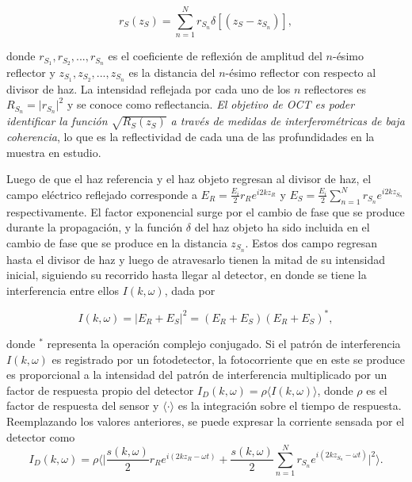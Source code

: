 \begin{equation}
r_S(z_S) = \sum_{n=1}^{N} r_{S_n} \delta[(z_S - z_{S_n})],
\end{equation}

\noindent donde $r_{S_1}, r_{S_2}, ..., r_{S_n}$ es el coeficiente de reflexión de amplitud del $n$-ésimo reflector y $ z_{S_1}, z_{S_2}, ..., z_{S_n}$ es la distancia del $n$-ésimo reflector con respecto al divisor de haz. La intensidad reflejada por cada uno de los $n$ reflectores es $R_{S_n} = \lvert r_{S_n} \rvert^2$ y se conoce como reflectancia. \emph{El objetivo de OCT es poder identificar la función $\sqrt{R_{S}(z_S)}$ a través de medidas de interferométricas de baja coherencia}, lo que es la reflectividad de cada una de las profundidades en la muestra en estudio.

Luego de que el haz referencia y el haz objeto regresan al divisor de haz, el campo eléctrico reflejado corresponde a $E_R = \frac{E_i}{2}r_Re^{i2kz_R}$ y $E_S = \frac{E_i}{2} \sum_{n=1}^{N}r_{S_n} e^{i2kz_{S_n}}$ respectivamente. El factor exponencial surge por el cambio de fase que se produce durante la propagación, y la función $\delta$ del haz objeto ha sido incluida en el cambio de fase que se produce en la distancia $z_{S_n}$. Estos dos campo regresan hasta el divisor de haz y luego de atravesarlo tienen la mitad de su intensidad inicial, siguiendo su recorrido hasta llegar al detector, en donde se tiene la interferencia entre ellos $I(k,\omega)$, dada por

\begin{equation}
\label{eq:I_1}
I(k,\omega) =\lvert E_R+E_S \rvert^2 = (E_R + E_S)(E_R + E_S)^{\ast},
\end{equation}

\noindent donde $^{\ast}$ representa la operación complejo conjugado. Si el patrón de interferencia $I(k,\omega)$ es registrado por un fotodetector, la fotocorriente que en este se produce es proporcional a la intensidad del patrón de interferencia multiplicado por un factor de respuesta propio del detector $I_D(k, \omega) = \rho \langle I(k, \omega) \rangle$, donde $\rho$ es el factor de respuesta del sensor y $\langle \cdot \rangle$ es la integración sobre el tiempo de respuesta. Reemplazando los valores anteriores, se puede expresar la corriente sensada por el detector como
%
\begin{equation}
\label{eq:Id}
I_D(k, \omega) = \rho \bigg\langle \bigg\lvert \frac{s(k, \omega)}{2} r_R e^{i(2kz_R-\omega t)} + \frac{s(k, \omega)}{2} \sum_{n=1}^{N} r_{S_n} e^{i(2kz_{S_n} - \omega t)} \bigg\rvert^2 \bigg\rangle.
\end{equation}

